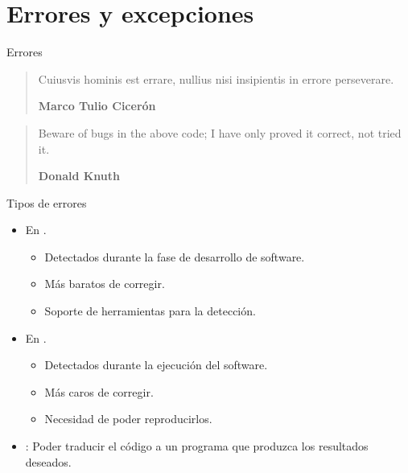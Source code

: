 \section{Errores y excepciones}

\begin{frame}{Errores}
\begin{quote}
Cuiusvis hominis est errare, nullius nisi insipientis in errore perseverare.

\textbf{Marco Tulio Cicerón}
\end{quote}


\begin{quote}
Beware of bugs in the above code; I have only proved it correct, not tried it.

\textbf{Donald Knuth}
\end{quote}
\end{frame}

\begin{frame}[t]{Tipos de errores}
\begin{itemize}
  \item En .
    \begin{itemize}
      \item Detectados durante la fase de desarrollo de software.
      \item Más baratos de corregir.
      \item Soporte de herramientas para la detección.
    \end{itemize}

  \item En .
    \begin{itemize}
      \item Detectados durante la ejecución del software.
      \item Más caros de corregir.
      \item Necesidad de poder reproducirlos.
    \end{itemize}

  \item {}: 
        Poder traducir el código a un programa que produzca los resultados deseados.
\end{itemize}
\end{frame}

